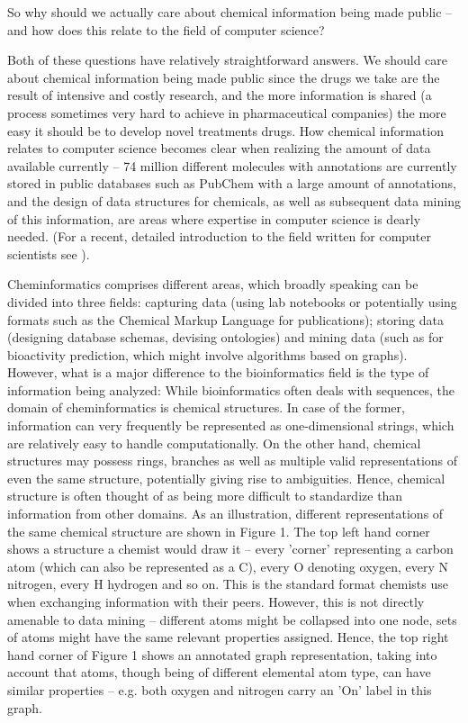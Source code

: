 \documentclass{sig-alternate}
\begin{document}
So why should we actually care about chemical information being made public --
and how does this relate to the field of computer science?

Both of these questions have relatively straightforward answers. We should care
about chemical information being made public since the drugs we take are the
result of intensive and costly research, and the more information is shared (a
process sometimes very hard to achieve in pharmaceutical companies) the more
easy it should be to develop novel treatments drugs. How chemical information
relates to computer science becomes clear when realizing the amount of data
available currently -- 74 million different molecules with annotations are
currently stored in public databases such as PubChem with a large amount of
annotations, and the design of data structures for chemicals, as well as
subsequent data mining of this information, are areas where expertise in
computer science is dearly needed. (For a recent, detailed introduction to the
field written for computer scientists see \cite{brown2009}). 

Cheminformatics comprises different areas, which broadly speaking can be divided
into three fields: capturing data (using lab notebooks or potentially using
formats such as the Chemical Markup Language for publications); storing data
(designing database schemas, devising ontologies) and mining data (such as for
bioactivity prediction, which might involve algorithms based on graphs).
However, what is a major difference to the bioinformatics field is the type of
information being analyzed: While bioinformatics often deals with sequences, the
domain of cheminformatics is chemical structures. In case of the former,
information can very frequently be represented as one-dimensional strings, which
are relatively easy to handle computationally. On the other hand, chemical
structures may possess rings, branches as well as multiple valid representations
of even the same structure, potentially giving rise to ambiguities. Hence,
chemical structure is often thought of as being more difficult to standardize
than information from other domains. As an illustration, different
representations of the same chemical structure are shown in Figure 1. The top
left hand corner shows a structure a chemist would draw it -- every 'corner'
representing a carbon atom (which can also be represented as a C), every O
denoting oxygen, every N nitrogen, every H hydrogen and so on. This is the
standard format chemists use when exchanging information with their peers.
However, this is not directly amenable to data mining -- different atoms might
be collapsed into one node, sets of atoms might have the same relevant
properties assigned. Hence, the top right hand corner of Figure 1 shows an
annotated graph representation, taking into account that atoms, though being of
different elemental atom type, can have similar properties -- e.g. both oxygen
and nitrogen carry an 'On' label in this graph.
\end{document}
